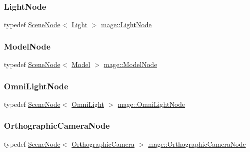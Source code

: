 \hypertarget{namespacemage_a7516e49e86864dbb1196ceed9a11ac6a}{}\label{namespacemage_a7516e49e86864dbb1196ceed9a11ac6a} 
\subsubsection{\texorpdfstring{Light\+Node}{LightNode}}
{\footnotesize\ttfamily typedef \hyperlink{classmage_1_1_scene_node}{Scene\+Node}$<$ \hyperlink{classmage_1_1_light}{Light} $>$ \hyperlink{namespacemage_a7516e49e86864dbb1196ceed9a11ac6a}{mage\+::\+Light\+Node}}

\hypertarget{namespacemage_a3086b6de2ec7ebd59d8b0bdc57195760}{}\label{namespacemage_a3086b6de2ec7ebd59d8b0bdc57195760} 
\subsubsection{\texorpdfstring{Model\+Node}{ModelNode}}
{\footnotesize\ttfamily typedef \hyperlink{classmage_1_1_scene_node}{Scene\+Node}$<$ \hyperlink{classmage_1_1_model}{Model} $>$ \hyperlink{namespacemage_a3086b6de2ec7ebd59d8b0bdc57195760}{mage\+::\+Model\+Node}}

\hypertarget{namespacemage_a5d71843ded3749108547eba2a5ce4d85}{}\label{namespacemage_a5d71843ded3749108547eba2a5ce4d85} 
\subsubsection{\texorpdfstring{Omni\+Light\+Node}{OmniLightNode}}
{\footnotesize\ttfamily typedef \hyperlink{classmage_1_1_scene_node}{Scene\+Node}$<$ \hyperlink{classmage_1_1_omni_light}{Omni\+Light} $>$ \hyperlink{namespacemage_a5d71843ded3749108547eba2a5ce4d85}{mage\+::\+Omni\+Light\+Node}}

\hypertarget{namespacemage_ab4bde438cc5dd644b0092500df32a83e}{}\label{namespacemage_ab4bde438cc5dd644b0092500df32a83e} 
\subsubsection{\texorpdfstring{Orthographic\+Camera\+Node}{OrthographicCameraNode}}
{\footnotesize\ttfamily typedef \hyperlink{classmage_1_1_scene_node}{Scene\+Node}$<$ \hyperlink{classmage_1_1_orthographic_camera}{Orthographic\+Camera} $>$ \hyperlink{namespacemage_ab4bde438cc5dd644b0092500df32a83e}{mage\+::\+Orthographic\+Camera\+Node}}

